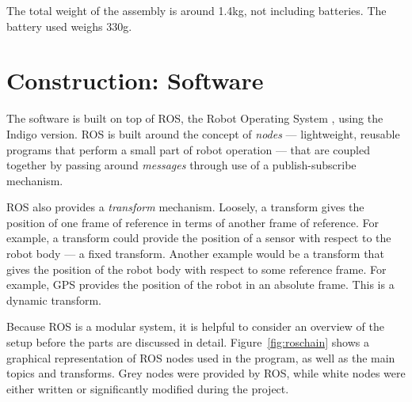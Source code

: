 \documentclass[12pt,oneside,a4paper]{book}
\begin{document}
The total weight of the assembly is around 1.4kg, not including
batteries. The battery used weighs 330g.

\chapter{Construction: Software}
\label{sec:software}

The software is built on top of ROS, the Robot Operating System
\cite{rosos}, using the Indigo version. ROS is built around the
concept of \emph{nodes} --- lightweight, reusable programs that
perform a small part of robot operation --- that are coupled together
by passing around \emph{messages} through use of a publish-subscribe
mechanism.


ROS also provides a \emph{transform} mechanism. Loosely, a transform
gives the position of one frame of reference in terms of another frame
of reference. For example, a transform could provide the position of a
sensor with respect to the robot body --- a fixed transform. Another
example would be a transform that gives the position of the robot body with
respect to some reference frame. For example, GPS provides the
position of the robot in an absolute frame. This is a dynamic transform.

Because ROS is a modular system, it is helpful to consider an
overview of the setup before the parts are discussed in
detail. Figure~\ref{fig:roschain} shows a graphical representation of
ROS nodes used in the program, as well as the main topics and
transforms. Grey nodes were provided by ROS, while white nodes were
either written or significantly modified during the project.
\end{document}

